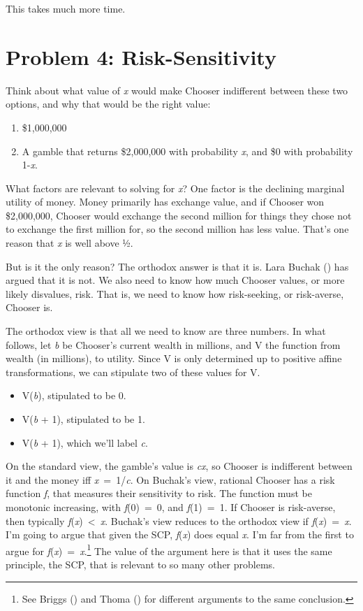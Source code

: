 \documentclass[
  10pt,
  letterpaper,
  DIV=11,
  numbers=noendperiod,
  twoside]{scrartcl}
\providecommand{\tightlist}{%
  \setlength{\itemsep}{0pt}\setlength{\parskip}{0pt}}\usepackage{longtable,booktabs,array}
\begin{document}
This takes much more time.

\section{Problem 4: Risk-Sensitivity}\label{sec-buchak}

Think about what value of \emph{x} would make Chooser indifferent
between these two options, and why that would be the right value:

\begin{enumerate}
\def\labelenumi{\arabic{enumi}.}
\tightlist
\item
  \$1,000,000
\item
  A gamble that returns \$2,000,000 with probability \emph{x}, and \$0
  with probability 1-\emph{x}.
\end{enumerate}

What factors are relevant to solving for \emph{x}? One factor is the
declining marginal utility of money. Money primarily has exchange value,
and if Chooser won \$2,000,000, Chooser would exchange the second
million for things they chose not to exchange the first million for, so
the second million has less value. That's one reason that \emph{x} is
well above ½.

But is it the only reason? The orthodox answer is that it is. Lara
Buchak () has argued that it is not. We
also need to know how much Chooser values, or more likely disvalues,
risk. That is, we need to know how risk-seeking, or risk-averse, Chooser
is.

The orthodox view is that all we need to know are three numbers. In what
follows, let \emph{b} be Chooser's current wealth in millions, and V the
function from wealth (in millions), to utility. Since V is only
determined up to positive affine transformations, we can stipulate two
of these values for V.

\begin{itemize}
\tightlist
\item
  V(\emph{b}), stipulated to be 0.
\item
  V(\emph{b} + 1), stipulated to be 1.
\item
  V(\emph{b} + 1), which we'll label \emph{c}.
\end{itemize}

On the standard view, the gamble's value is \emph{cx}, so Chooser is
indifferent between it and the money iff \emph{x}~=~1/\emph{c}. On
Buchak's view, rational Chooser has a risk function \emph{f}, that
measures their sensitivity to risk. The function must be monotonic
increasing, with \emph{f}(0)~=~0, and \emph{f}(1)~=~1. If Chooser is
risk-averse, then typically \emph{f}(\emph{x})~\textless~\emph{x}.
Buchak's view reduces to the orthodox view if
\emph{f}(\emph{x})~=~\emph{x}. I'm going to argue that given the SCP,
\emph{f}(\emph{x}) does equal \emph{x}. I'm far from the first to argue
for \emph{f}(\emph{x})~=~\emph{x}.\footnote{See Briggs
  () and Thoma
  () for different arguments to the same
  conclusion.} The value of the argument here is that it uses the same
principle, the SCP, that is relevant to so many other problems.
\end{document}

